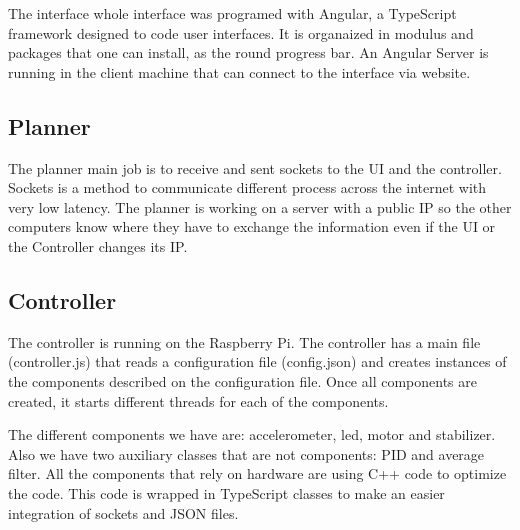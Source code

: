 The interface whole interface was programed with Angular, a TypeScript framework designed to code user interfaces.
It is organaized in modulus and packages that one can install, as the round progress bar. An Angular Server is 
running in the client machine that can connect to the interface via website.

\subsection{Planner}
The planner main job is to receive and sent sockets to the UI and the controller. Sockets is a method to communicate
different process across the internet with very low latency. The planner is working on a server with a public IP
so the other computers know where they have to exchange the information even if the UI or the Controller changes its IP.

\subsection{Controller}
The controller is running on the Raspberry Pi. The controller has a main file (controller.js) that reads
a configuration file (config.json) and creates instances of the components described on the configuration file.
Once all components are created, it starts different threads for each of the components.

The different components we have are: accelerometer, led, motor and stabilizer. Also we have two auxiliary classes that are
not components: PID and average filter. All the components that rely on hardware are using C++ code to optimize
the code. This code is wrapped in TypeScript classes to make an easier integration of sockets and JSON files.
